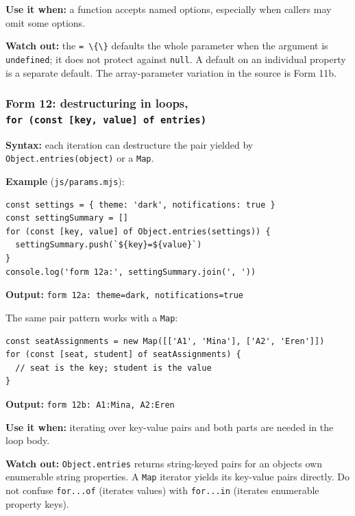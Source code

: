 \documentclass[
]{article}
\newcommand{\passthrough}[1]{#1}
\begin{document}
\textbf{Use it when:} a function accepts named options, especially when
callers may omit some options.

\textbf{Watch out:} the \passthrough{\lstinline!= \{\}!} defaults the
whole parameter when the argument is
\passthrough{\lstinline!undefined!}; it does not protect against
\passthrough{\lstinline!null!}. A default on an individual property is a
separate default. The array-parameter variation in the source is Form
11b.

\subsubsection{\texorpdfstring{Form 12: destructuring in loops,
\texttt{for\ (const\ {[}key,\ value{]}\ of\ entries)}}{Form 12: destructuring in loops, for (const {[}key, value{]} of entries)}}\label{form-12-destructuring-in-loops-for-const-key-value-of-entries}

\textbf{Syntax:} each iteration can destructure the pair yielded by
\passthrough{\lstinline!Object.entries(object)!} or a
\passthrough{\lstinline!Map!}.

\textbf{Example} (\passthrough{\lstinline!js/params.mjs!}):

\begin{lstlisting}
const settings = { theme: 'dark', notifications: true }
const settingSummary = []
for (const [key, value] of Object.entries(settings)) {
  settingSummary.push(`${key}=${value}`)
}
console.log('form 12a:', settingSummary.join(', '))
\end{lstlisting}

\textbf{Output:}
\passthrough{\lstinline!form 12a: theme=dark, notifications=true!}

The same pair pattern works with a \passthrough{\lstinline!Map!}:

\begin{lstlisting}
const seatAssignments = new Map([['A1', 'Mina'], ['A2', 'Eren']])
for (const [seat, student] of seatAssignments) {
  // seat is the key; student is the value
}
\end{lstlisting}

\textbf{Output:} \passthrough{\lstinline!form 12b: A1:Mina, A2:Eren!}

\textbf{Use it when:} iterating over key-value pairs and both parts are
needed in the loop body.

\textbf{Watch out:} \passthrough{\lstinline!Object.entries!} returns
string-keyed pairs for an object\textquotesingle s own enumerable string
properties. A \passthrough{\lstinline!Map!} iterator yields its
key-value pairs directly. Do not confuse
\passthrough{\lstinline!for...of!} (iterates values) with
\passthrough{\lstinline!for...in!} (iterates enumerable property keys).
\end{document}
